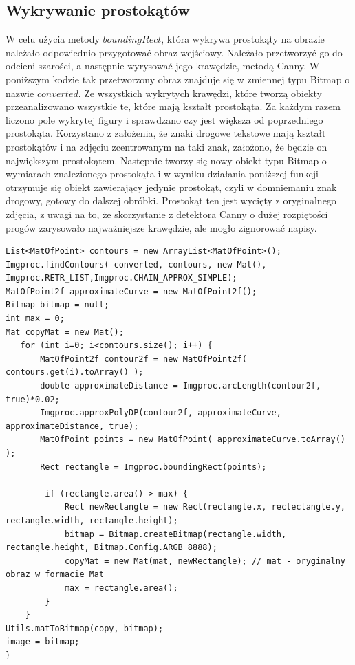 \documentclass[eng,oneside]{mgr}
\begin{document}
\subsection{Wykrywanie prostokątów}
W celu użycia metody $boundingRect$, która wykrywa prostokąty na obrazie należało odpowiednio przygotować obraz wejściowy. Należało przetworzyć go do odcieni szarości, a następnie wyrysować jego krawędzie, metodą Canny. W poniższym kodzie tak przetworzony obraz znajduje się w zmiennej typu Bitmap o nazwie $converted$. Ze wszystkich wykrytych krawędzi, które tworzą obiekty przeanalizowano wszystkie te, które mają kształt prostokąta. Za każdym razem liczono pole wykrytej figury i sprawdzano czy jest większa od poprzedniego prostokąta. Korzystano z założenia, że znaki drogowe tekstowe mają kształt prostokątów i na zdjęciu zcentrowanym na taki znak, założono, że będzie on największym prostokątem. Następnie tworzy się nowy obiekt typu Bitmap o wymiarach znalezionego prostokąta i w wyniku działania poniższej funkcji otrzymuje się obiekt zawierający jedynie prostokąt, czyli w domniemaniu znak drogowy, gotowy do dalszej obróbki. Prostokąt ten jest wycięty z oryginalnego zdjęcia, z uwagi na to, że skorzystanie z detektora Canny o dużej rozpiętości progów zarysowało najważniejsze krawędzie, ale mogło zignorować napisy.
\begin{lstlisting}[caption={Kod programu, odpowiadający za wykrycie prostokątów przy użyciu biblioteki Open CV}]
List<MatOfPoint> contours = new ArrayList<MatOfPoint>();
Imgproc.findContours( converted, contours, new Mat(), Imgproc.RETR_LIST,Imgproc.CHAIN_APPROX_SIMPLE);
MatOfPoint2f approximateCurve = new MatOfPoint2f();
Bitmap bitmap = null;
int max = 0;
Mat copyMat = new Mat();
   for (int i=0; i<contours.size(); i++) {
       MatOfPoint2f contour2f = new MatOfPoint2f( contours.get(i).toArray() );
       double approximateDistance = Imgproc.arcLength(contour2f, true)*0.02;
       Imgproc.approxPolyDP(contour2f, approximateCurve, approximateDistance, true);
       MatOfPoint points = new MatOfPoint( approximateCurve.toArray() );
       Rect rectangle = Imgproc.boundingRect(points);

		if (rectangle.area() > max) {
	   		Rect newRectangle = new Rect(rectangle.x, rectectangle.y, rectangle.width, rectangle.height);
    		bitmap = Bitmap.createBitmap(rectangle.width, rectangle.height, Bitmap.Config.ARGB_8888);
    		copyMat = new Mat(mat, newRectangle); // mat - oryginalny obraz w formacie Mat
			max = rectangle.area();
        }
    }
Utils.matToBitmap(copy, bitmap);
image = bitmap;
}
\end{lstlisting}
\end{document}
